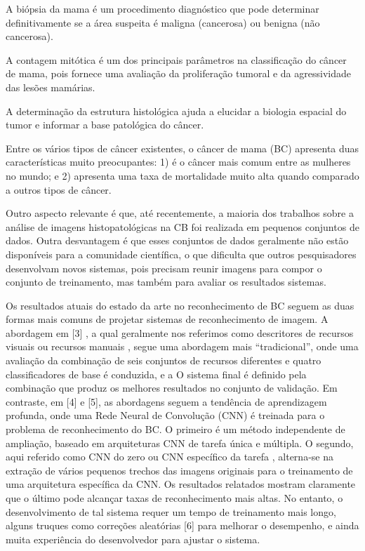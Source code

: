 \documentclass[preprint,12pt,authoryear]{elsarticle}
\begin{document}
 A biópsia da mama é um procedimento diagnóstico que pode determinar definitivamente se a área suspeita é maligna (cancerosa) ou benigna (não cancerosa). \cite{WAN2017a}
 
 A contagem mitótica é um dos principais parâmetros na classificação do câncer de mama, pois fornece uma avaliação da proliferação tumoral e da agressividade das lesões mamárias. \cite{WAN2017a}
 
 A determinação da estrutura histológica ajuda a elucidar a biologia espacial do tumor e informar a base patológica do câncer. \cite{NGUYEN2017}
 
 Entre os vários tipos de câncer existentes, o câncer de mama (BC) apresenta duas características muito preocupantes: 1) é o câncer mais comum entre as mulheres no mundo; e 2) apresenta uma taxa de mortalidade muito alta quando comparado a outros tipos de câncer. \cite{SPANHOL2017}
 
 Outro aspecto relevante é que, até recentemente, a maioria dos trabalhos sobre a análise de imagens histopatológicas na CB foi realizada em pequenos conjuntos de dados. Outra desvantagem é que esses conjuntos de dados geralmente não estão disponíveis para a comunidade científica, o que dificulta que outros pesquisadores desenvolvam novos sistemas, pois precisam reunir imagens para compor o conjunto de treinamento, mas também para avaliar os resultados sistemas. \cite{SPANHOL2017}
 
 Os resultados atuais do estado da arte no reconhecimento de BC seguem as duas formas mais comuns de projetar sistemas de reconhecimento de imagem. A abordagem em [3] , a qual geralmente nos referimos como descritores de recursos visuais ou recursos manuais , segue uma abordagem mais “tradicional”, onde uma avaliação da combinação de seis conjuntos de recursos diferentes e quatro classificadores de base é conduzida, e a O sistema final é definido pela combinação que produz os melhores resultados no conjunto de validação. Em contraste, em [4] e [5], as abordagens seguem a tendência de aprendizagem profunda, onde uma Rede Neural de Convolução (CNN) é treinada para o problema de reconhecimento do BC. O primeiro é um método independente de ampliação, baseado em arquiteturas CNN de tarefa única e múltipla. O segundo, aqui referido como CNN do zero ou CNN específico da tarefa , alterna-se na extração de vários pequenos trechos das imagens originais para o treinamento de uma arquitetura específica da CNN. Os resultados relatados mostram claramente que o último pode alcançar taxas de reconhecimento mais altas. No entanto, o desenvolvimento de tal sistema requer um tempo de treinamento mais longo, alguns truques como correções aleatórias [6] para melhorar o desempenho, e ainda muita experiência do desenvolvedor para ajustar o sistema.
 
\end{document}
